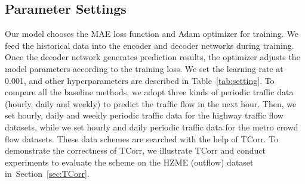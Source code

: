 \documentclass[sn-mathphys,iicol]{sn-jnl}
\newcommand\tabref[1]{Table~\ref{#1}}
\newcommand\secref[1]{Section~\ref{#1}}
\theoremstyle{thmstyleone}\newtheorem{theorem}{Theorem}\newtheorem{proposition}[theorem]{Proposition}
\theoremstyle{thmstyletwo}\newtheorem{example}{Example}\newtheorem{remark}{Remark}
\theoremstyle{thmstylethree}\newtheorem{definition}{Definition}
\begin{document}
\subsection{Parameter Settings}
    Our model chooses the MAE loss function and Adam optimizer for training. We feed the historical data into the encoder and decoder networks during training. Once the decoder network generates prediction results, the optimizer adjusts the model parameters according to the training loss. We set the learning rate at 0.001, and other hyperparameters are described in \tabref{tab:setting}. To compare all the baseline methods, we adopt three kinds of periodic traffic data (hourly, daily and weekly) to predict the traffic flow in the next hour. Then, we set hourly, daily and weekly periodic traffic data for the highway traffic flow datasets, while we set hourly and daily periodic traffic data for the metro crowd flow datasets. These data schemes are searched with the help of TCorr. To demonstrate the correctness of TCorr, we illustrate TCorr and conduct experiments to evaluate the scheme on the HZME (outflow) dataset in~\secref{sec:TCorr}.
    
\end{document}
